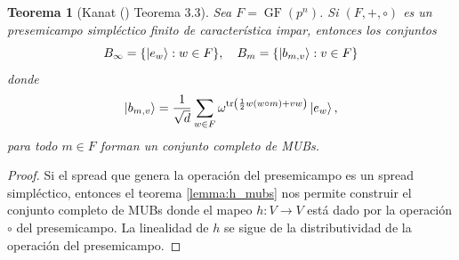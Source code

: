 \documentclass[a4paper]{report}
\DeclareMathOperator{\tr}{tr}
\DeclareMathOperator{\GF}{GF}
\newtheorem{theorem}{Teorema}
\begin{document}
  \begin{theorem}[Kanat (\cite{abdukhalikov2015}) Teorema 3.3]
    \label{thm:kanat_presemi_mubs}
    Sea $F = \GF(p^{n})$. Si $(F, +, \circ)$ es un
    presemicampo simpléctico finito de característica impar,
    entonces los conjuntos
    \begin{equation}
      B_\infty = \{\ket{e_w} : w \in F\},
      \quad
      B_m = \{\ket{b_{m,v}} : v \in F\}
    \end{equation}
    donde 
    \begin{equation}
      \label{eqn:kanat_presemi_mubs}
      \ket{b_{m,v}}
      = \frac{1}{\sqrt{d}} \sum_{w \in F}^{}
      \omega^{\tr\left(
          \frac{1}{2} w (w \circ m) + v w
      \right) } \ket{e_w},
    \end{equation} 
    para todo $m \in F$ forman un conjunto completo de MUBs.
  \end{theorem}
  \begin{proof}
    Si el spread que genera la operación del presemicampo es
    un spread simpléctico, entonces el teorema
    \ref{lemma:h_mubs} nos permite construir el conjunto
    completo de MUBs donde el mapeo $h : V \to V$ está dado
    por la operación $\circ$ del presemicampo. La linealidad
    de $h$ se sigue de la distributividad de la operación
    del presemicampo.
  \end{proof}
\end{document}
